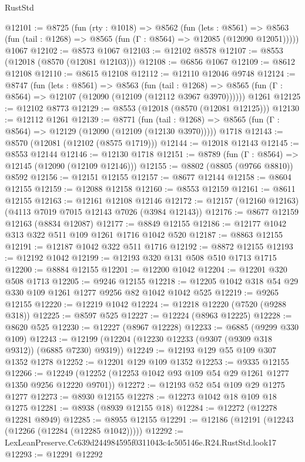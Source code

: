 \begin{lexlean}{RustStd}
\begin{coremodule}
@12101 := @8725
    (fun (rty : @1018) =>
    @8562
      (fun (lets : @8561) =>
      @8563 (fun (tail : @1268) => @8565 (fun (Γ : @8564) => @12085 (@12090 @12051)))))
    @1067
@12102 := @8573 @1067
@12103 := @12102 @8578
@12107 := @8553 (@12018 (@8570 (@12081 @12103)))
@12108 := @6856 @1067
@12109 := @8612 @12108
@12110 := @8615 @12108
@12112 := @12110 @12046 @9748
@12124 := @8747
    (fun (lets : @8561) =>
    @8563
      (fun (tail : @1268) =>
      @8565 (fun (Γ : @8564) => @12107 (@12090 (@12109 (@12112 @3967 @3970))))))
    @1261
@12125 := @12102 @8773
@12129 := @8553 (@12018 (@8570 (@12081 @12125)))
@12130 := @12112 @1261
@12139 := @8771
    (fun (tail : @1268) => @8565 (fun (Γ : @8564) => @12129 (@12090 (@12109 (@12130 @3970)))))
    @1718
@12143 := @8570 (@12081 (@12102 (@8575 @1719)))
@12144 := @12018 @12143
@12145 := @8553 @12144
@12146 := @12130 @1718
@12151 := @8789 (fun (Γ : @8564) => @12145 (@12090 (@12109 @12146)))
@12155 := @8802 (@8805 (@9766 @8810)) @8592
@12156 := @12151 @12155
@12157 := @8677 @12144
@12158 := @8604 @12155
@12159 := @12088 @12158
@12160 := @8553 @12159
@12161 := @8611 @12155
@12163 := @12161 @12108 @12146
@12172 := @12157 (@12160 @12163) (@4113 @7019 @7015 @12143 @7026 (@3984 @12143))
@12176 := @8677 @12159 @12163 (@8834 @12087)
@12177 := @8849 @12155
@12186 := @12177 @1042 @313 @322 @511 @109 @1261 @1716 @1042 @520
@12187 := @8863 @12155
@12191 := @12187 @1042 @322 @511 @1716
@12192 := @8872 @12155
@12193 := @12192 @1042
@12199 := @12193 @320 @131 @508 @510 @1713 @1715
@12200 := @8884 @12155
@12201 := @12200 @1042
@12204 := @12201 @320 @508 @1713
@12205 := @9246 @12155
@12218 := @12205 @1042 @318 @54 @29 @330 @109 @1261 @1277 @9256 @82 @1042 @1042 @525
@12219 := @9265 @12155
@12220 := @12219 @1042
@12224 := @12218 @12220 (@7520 (@9288 @318))
@12225 := @8597 @525
@12227 := @12224 (@8963 @12225)
@12228 := @8620 @525
@12230 := @12227 (@8967 @12228)
@12233 := @6885 (@9299 @330 @109)
@12243 := @12199 (@12204 (@12230 @12233 (@9307 (@9309 @318 @9312)) (@6885 @7230) @9319))
@12249 := @12193 @129 @55 @109 @307 @1352 @1278
@12252 := @12201 @129 @109 @1352
@12253 := @9335 @12155
@12266 := @12249 (@12252 (@12253 @1042 @93 @109 @54 @29 @1261 @1277 @1350 @9256 @12220 @9701))
@12272 := @12193 @52 @54 @109 @29 @1275 @1277
@12273 := @8930 @12155
@12278 := @12273 @1042 @18 @109 @18 @1275
@12281 := @8938 (@8939 @12155 @18)
@12284 := @12272 (@12278 @12281 @8949)
@12285 := @8955 @12155
@12291 := @12186 (@12191 (@12243 (@12266 (@12284 (@12285 @1042)))))
@12292 := LexLeanPreserve.Cc639d244984595f0311043c4c505146e.R24.RustStd.look17
@12293 := @12291 @12292

\end{coremodule}
\end{lexlean}
